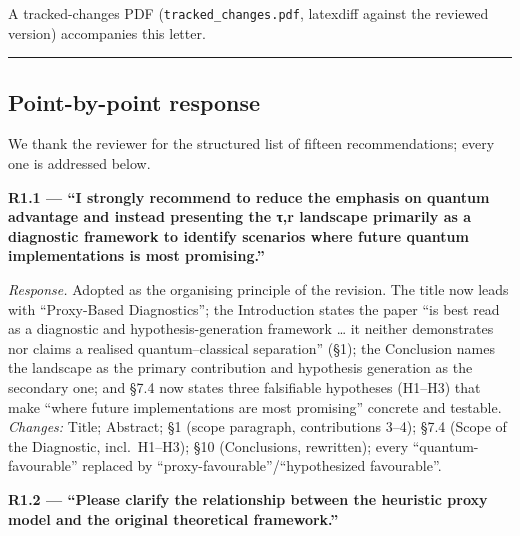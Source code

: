 \documentclass[
  11pt,
]{article}
\begin{document}
A tracked-changes PDF (\texttt{tracked\_changes.pdf}, latexdiff against
the reviewed version) accompanies this letter.

\begin{center}\rule{0.5\linewidth}{0.5pt}\end{center}

\subsection{Point-by-point response}\label{point-by-point-response}

We thank the reviewer for the structured list of fifteen
recommendations; every one is addressed below.

\textbf{R1.1 --- ``I strongly recommend to reduce the emphasis on
quantum advantage and instead presenting the τ,r landscape primarily as
a diagnostic framework to identify scenarios where future quantum
implementations is most promising.''}

\emph{Response.} Adopted as the organising principle of the revision.
The title now leads with ``Proxy-Based Diagnostics''; the Introduction
states the paper ``is best read as a diagnostic and
hypothesis-generation framework \ldots{} it neither demonstrates nor
claims a realised quantum--classical separation'' (§1); the Conclusion
names the landscape as the primary contribution and hypothesis
generation as the secondary one; and §7.4 now states three falsifiable
hypotheses (H1--H3) that make ``where future implementations are most
promising'' concrete and testable. \emph{Changes:} Title; Abstract; §1
(scope paragraph, contributions 3--4); §7.4 (Scope of the Diagnostic,
incl.~H1--H3); §10 (Conclusions, rewritten); every
``quantum-favourable'' replaced by ``proxy-favourable''/``hypothesized
favourable''.

\textbf{R1.2 --- ``Please clarify the relationship between the heuristic
proxy model and the original theoretical framework.''}
\end{document}
